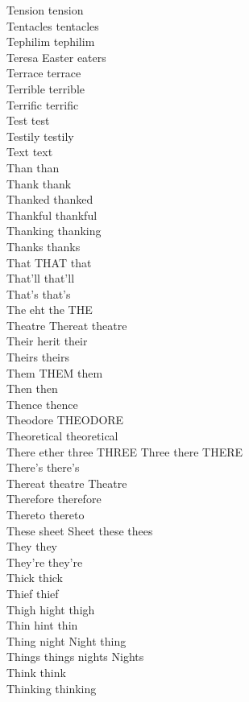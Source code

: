 Tension tension\\
Tentacles tentacles\\
Tephilim tephilim\\
Teresa Easter eaters\\
Terrace terrace\\
Terrible terrible\\
Terrific terrific\\
Test test\\
Testily testily\\
Text text\\
Than than\\
Thank thank\\
Thanked thanked\\
Thankful thankful\\
Thanking thanking\\
Thanks thanks\\
That THAT that\\
That'll that'll\\
That's that's\\
The eht the THE\\
Theatre Thereat theatre\\
Their herit their\\
Theirs theirs\\
Them THEM them\\
Then then\\
Thence thence\\
Theodore THEODORE\\
Theoretical theoretical\\
There ether three THREE Three there THERE\\
There's there's\\
Thereat theatre Theatre\\
Therefore therefore\\
Thereto thereto\\
These sheet Sheet these thees\\
They they\\
They're they're\\
Thick thick\\
Thief thief\\
Thigh hight thigh\\
Thin hint thin\\
Thing night Night thing\\
Things things nights Nights\\
Think think\\
Thinking thinking\\
